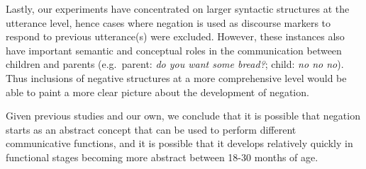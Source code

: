 \documentclass[
  english,
  man,floatsintext]{apa6}
\begin{document}
Lastly, our experiments have concentrated on larger syntactic structures at the utterance level, hence cases where negation is used as discourse markers to respond to previous utterance(s) were excluded. However, these instances also have important semantic and conceptual roles in the communication between children and parents (e.g.~parent: \emph{do you want some bread?}; child: \emph{no no no}). Thus inclusions of negative structures at a more comprehensive level would be able to paint a more clear picture about the development of negation.

Given previous studies and our own, we conclude that it is possible that negation starts as an abstract concept that can be used to perform different communicative functions, and it is possible that it develops relatively quickly in functional stages becoming more abstract between 18-30 months of age.

\begingroup
\setlength{\parindent}{-0.5in}
\setlength{\leftskip}{0.5in}

\endgroup
\end{document}
